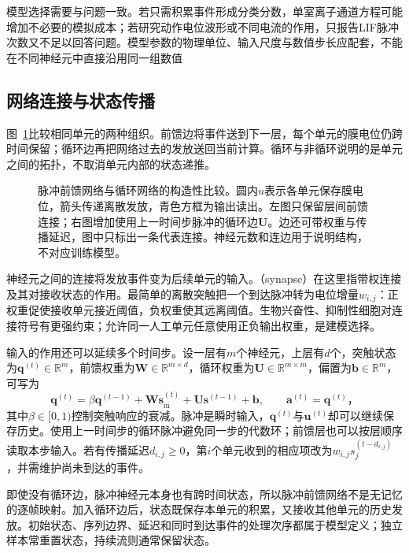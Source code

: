 模型选择需要与问题一致。若只需积累事件形成分类分数，单室离子通道方程可能增加不必要的模拟成本；若研究动作电位波形或不同电流的作用，只报告LIF脉冲次数又不足以回答问题。模型参数的物理单位、输入尺度与数值步长应配套，不能在不同神经元中直接沿用同一组数值

\subsection{网络连接与状态传播}
\label{sec:snn-connections}

图~\ref{fig:snn-connections}比较相同单元的两种组织。前馈边将事件送到下一层，每个单元的膜电位仍跨时间保留；循环边再把网络过去的发放送回当前计算。循环与非循环说明的是单元之间的拓扑，不取消单元内部的状态递推。
\begin{figure}[htbp]
  \centering
  
  \caption{脉冲前馈网络与循环网络的构造性比较。圆内$u$表示各单元保存膜电位，箭头传递离散发放，青色方框为输出读出。左图只保留层间前馈连接；右图增加使用上一时间步脉冲的循环边$\bm U$。边还可带权重与传播延迟，图中只标出一条代表连接。神经元数和连边用于说明结构，不对应训练模型。}
  \label{fig:snn-connections}
\end{figure}

神经元之间的连接将发放事件变为后续单元的输入。（synapse）在这里指带权连接及其对接收状态的作用。最简单的离散突触把一个到达脉冲转为电位增量$w_{i,j}$：正权重促使接收单元接近阈值，负权重使其远离阈值。生物兴奋性、抑制性细胞对连接符号有更强约束；允许同一人工单元任意使用正负输出权重，是建模选择。

输入的作用还可以延续多个时间步。设一层有$m$个神经元，上层有$d$个，突触状态为$\bm q^{(t)}\in\mathbb R^m$，前馈权重为$\bm W\in\mathbb R^{m\times d}$，循环权重为$\bm U\in\mathbb R^{m\times m}$，偏置为$\bm b\in\mathbb R^m$，可写为
\begin{equation}
  \bm q^{(t)}=\beta\bm q^{(t-1)}
    +\bm W\bm s_{\mathrm{in}}^{(t)}
    +\bm U\bm s^{(t-1)}+\bm b,\qquad
  \bm a^{(t)}=\bm q^{(t)}\text{，}
  \label{eq:snn-synaptic-state}
\end{equation}
其中$\beta\in[0,1)$控制突触响应的衰减。脉冲是瞬时输入，$\bm q^{(t)}$与$\bm u^{(t)}$却可以继续保存历史。使用上一时间步的循环脉冲避免同一步的代数环；前馈层也可以按层顺序读取本步输入。若有传播延迟$d_{i,j}\geq0$，第$i$个单元收到的相应项改为$w_{i,j}s_j^{(t-d_{i,j})}$，并需维护尚未到达的事件。

即使没有循环边，脉冲神经元本身也有跨时间状态，所以脉冲前馈网络不是无记忆的逐帧映射。加入循环边后，状态既保存本单元的积累，又接收其他单元的历史发放。初始状态、序列边界、延迟和同时到达事件的处理次序都属于模型定义；独立样本常重置状态，持续流则通常保留状态。

